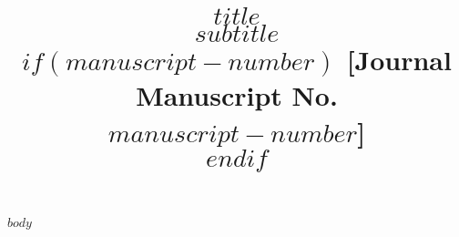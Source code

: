 \documentclass[11pt, a4paper]{article}
\begin{document}

\title{$title$ \\
\textbf{$subtitle$} \\
$if(manuscript-number)$
{\footnotesize {[}Journal Manuscript No. $manuscript-number${]}}\\
$endif$}
\date{}
\author{}

\maketitle


$body$





\end{document}
